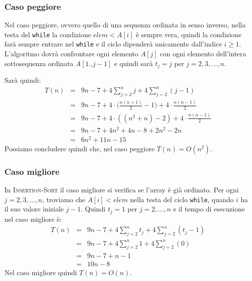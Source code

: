 \subsubsection{Caso peggiore}
Nel caso peggiore, ovvero quello di una sequenza ordinata in senso inverso, nella testa del \texttt{while} la condizione $elem<A[i]$ è sempre vera, quindi la condizione farà sempre entrare nel \texttt{while} e il ciclo dipenderà unicamente dall'indice $i\geq 1$. L'algoritmo dovrà confrontare ogni elemento $A[j]$ con ogni elemento dell'intera sottosequenza ordinata $A[1..j-1]$ e quindi sarà $t_{j}=j$ per $j=2,3,...,n$.

Sarà quindi:
\begin{eqnarray}
	T(n) &=& 9n-7+4\sum_{j=2}^{n}j+4\sum_{j=2}^{n}(j-1) \nonumber \\
	&=& 9n -7 + 4\cdot \bigl( \frac{n(n+1)}{2} -1\bigl) +4 \cdot \frac{n(n-1)}{2} \nonumber \\
	&=& 9n -7 + 4 \cdot ((n^{2}+n)-2)+4 \cdot \frac{n(n-1)}{2} \nonumber \\
	&=& 9n - 7 + 4n^{2}+ 4n -8 +2n^{2}-2n \nonumber \\
	&=& 6n^{2}+11n-15
\end{eqnarray}
Possiamo concludere quindi che, nel caso peggiore $T(n)=O(n^{2})$.

\subsubsection{Caso migliore}
In \textsc{Insertion-Sort} il caso migliore si verifica se l'array è già ordinato. Per ogni $j=2,3,...,n$, troviamo che $A[i]<elem$ nella testa del ciclo \texttt{while}, quando $i$ ha il suo valore iniziale $j-1$. Quindi $t_{j}=1$ per $j=2,...,n$ e il tempo di esecuzione nel caso migliore è:
\begin{eqnarray}
	T(n) &=& 9n-7+4\sum_{j=2}^{n}t_{j}+4\sum_{j=2}^{n}(t_{j}-1) \nonumber \\
	&=& 9n-7+4 \sum_{j=2}^{n}1+4\sum_{j=2}^{n}(0) \nonumber \\
	&=& 9n-7+n-1 \nonumber \\
	&=& 10n -8
\end{eqnarray}
Nel caso migliore quindi $T(n)=O(n)$.

